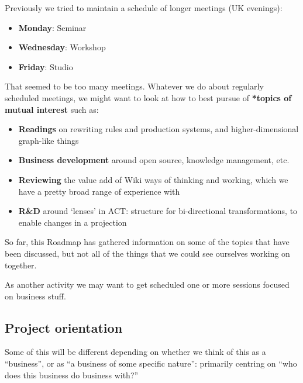 \documentclass[11pt]{article}
\begin{document}
Previously we tried to maintain a schedule of longer meetings (UK
evenings):

\begin{itemize}
\item \textbf{Monday}: Seminar
\item \textbf{Wednesday}: Workshop
\item \textbf{Friday}: Studio
\end{itemize}

That seemed to be too many meetings.  Whatever we do about regularly
scheduled meetings, we might want to look at how to best pursue of
\textbf{*topics of mutual interest} such as:

\begin{itemize}
\item \textbf{Readings} on rewriting rules and production systems, and higher-dimensional graph-like things
\item \textbf{Business development} around open source, knowledge management, etc.
\item \textbf{Reviewing} the value add of Wiki ways of thinking and working, which we have a pretty broad range of experience with
\item \textbf{R\&D} around ‘lenses’ in ACT: structure for bi-directional transformations, to enable changes in a projection
\end{itemize}

So far, this Roadmap has gathered information on some of the topics
that have been discussed, but not all of the things that we could see
ourselves working on together.

As another activity we may want to get scheduled one or more sessions
focused on business stuff.

\subsection{Project orientation}
\label{sec:orge3f50bd}

Some of this will be different depending on whether we think of this
as a “business”, or as “a business of some specific nature”: primarily
centring on “who does this business do business with?”
\end{document}
